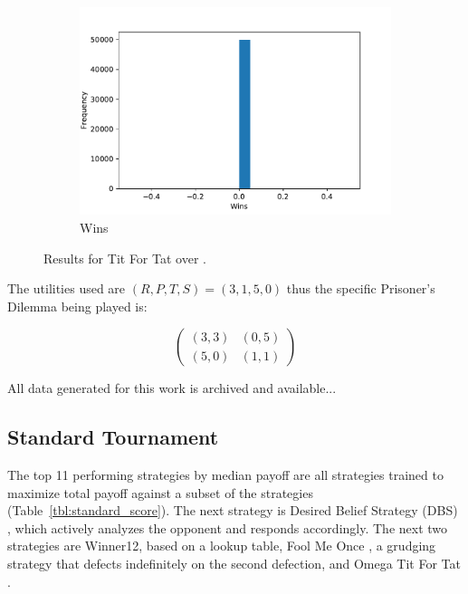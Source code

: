 \documentclass{article}
\begin{document}
\begin{figure}[!hbtp]
\begin{subfigure}[t]{.3\textwidth}
        \includegraphics[width=\textwidth]{./assets/standard_tft_wins.pdf}
        \caption{Wins}
        \label{fig:tit_for_tat_wins}
    \end{subfigure}%

    \caption{Results for Tit For Tat over
        \protecttournaments.}
\end{figure}

The utilities used are \((R, P, T, S)=(3, 1, 5, 0)\) thus the specific
Prisoner's Dilemma being played is:

\begin{equation}\label{equ:pd}
    \begin{pmatrix}
        (3, 3) & (0, 5)\\
        (5, 0) & (1, 1)
    \end{pmatrix}
\end{equation}

All data generated for this work is archived and available...

\subsection{Standard Tournament}\label{sec:standard}

The top 11 performing strategies by median payoff are all strategies trained to maximize
total payoff against a subset of the strategies (Table~\ref{tbl:standard_score}).
The next strategy is Desired Belief Strategy (DBS) \cite{Au2006},
which actively analyzes the opponent and responds
accordingly. The next two strategies are Winner12, based on a lookup table,
Fool Me Once \cite{axelrodproject}, a grudging strategy that defects indefinitely on
the second defection, and Omega Tit For Tat \cite{kendall2007iterated}.
\end{document}
